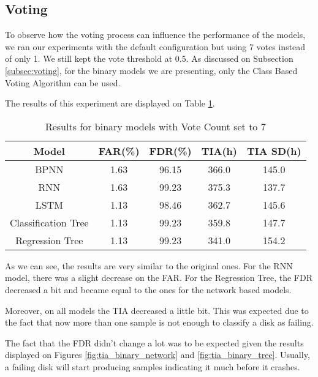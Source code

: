 \subsection{Voting}

To observe how the voting process can influence the performance of the models, we ran our experiments with the default configuration but using 7 votes instead of only 1.
We still kept the vote threshold at 0.5.
As discussed on Subsection \ref{subsec:voting}, for the binary models we are presenting, only the Class Based Voting Algorithm can be used.

The results of this experiment are displayed on Table \ref{table:results_binary_voting}. 

\begin{table}
  \begin{center}
    \begin{tabular}{|c|c|c|c|c|}
      \hline
    Model & FAR(\%) & FDR(\%) & TIA(h) & TIA SD(h) \\
    \hline
    BPNN & 1.63 & 96.15 & 366.0 & 145.0 \\
    RNN & 1.63 & 99.23 & 375.3 & 137.7 \\
    LSTM & 1.13 & 98.46 & 362.7 & 145.6\\
    Classification Tree & 1.13 & 99.23 & 359.8 & 147.7 \\
    Regression Tree & 1.13 & 99.23 & 341.0 & 154.2 \\
    \hline
    \end{tabular}
    \caption[Results Binary Models with Voting]{Results for binary models with Vote Count set to 7}
    \label{table:results_binary_voting}
  \end{center}
\end{table}

As we can see, the results are very similar to the original ones.
For the RNN model, there was a slight decrease on the FAR.
For the Regression Tree, the FDR decreased a bit and became equal to the ones for the network based models.

Moreover, on all models the TIA decreased a little bit.
This was expected due to the fact that now more than one sample is not enough to classify a disk as failing.

The fact that the FDR didn't change a lot was to be expected given the results displayed on Figures \ref{fig:tia_binary_network} and \ref{fig:tia_binary_tree}.
Usually, a failing disk will start producing samples indicating it much before it crashes.

